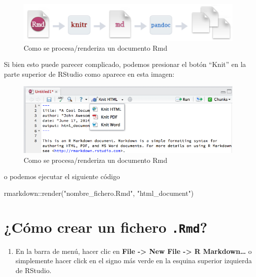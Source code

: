 \documentclass[
]{book}
\newenvironment{Shaded}{\begin{snugshade}}{\end{snugshade}}
\newcommand{\FunctionTok}[1]{\textcolor[rgb]{0.00,0.00,0.00}{#1}}
\newcommand{\NormalTok}[1]{#1}
\newcommand{\SpecialCharTok}[1]{\textcolor[rgb]{0.00,0.00,0.00}{#1}}
\newcommand{\StringTok}[1]{\textcolor[rgb]{0.31,0.60,0.02}{#1}}
\providecommand{\tightlist}{%
  \setlength{\itemsep}{0pt}\setlength{\parskip}{0pt}}
\begin{document}
\begin{figure}
\centering
\includegraphics{figures/render_rmarkdown.png}
\caption{Como se procesa/renderiza un documento Rmd}
\end{figure}

Si bien esto puede parecer complicado, podemos presionar el botón ``Knit'' en la parte superior de RStudio como aparece en esta imagen:

\begin{figure}
\centering
\includegraphics{figures/knit.png}
\caption{Como se procesa/renderiza un documento Rmd}
\end{figure}

o podemos ejecutar el siguiente código

\begin{Shaded}
\begin{Highlighting}[]
\NormalTok{rmarkdown}\SpecialCharTok{::}\FunctionTok{render}\NormalTok{(}\StringTok{"nombre\_fichero.Rmd"}\NormalTok{, }\StringTok{"html\_document"}\NormalTok{)}
\end{Highlighting}
\end{Shaded}

\hypertarget{cuxf3mo-crear-un-fichero-.rmd}{%
\section{\texorpdfstring{¿Cómo crear un fichero \texttt{.Rmd}?}{¿Cómo crear un fichero .Rmd?}}\label{cuxf3mo-crear-un-fichero-.rmd}}

\begin{enumerate}
\def\labelenumi{\arabic{enumi}.}
\tightlist
\item
  En la barra de menú, hacer clic en \textbf{File -\textgreater{} New File -\textgreater{} R Markdown\ldots{}} o simplemente hacer click en el signo más verde en la esquina superior izquierda de RStudio.
\end{enumerate}
\end{document}
